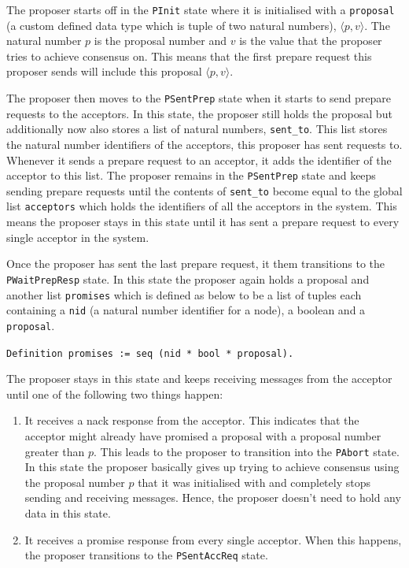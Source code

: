 The proposer starts off in the \texttt{PInit} state where it is initialised with
a \texttt{proposal} (a custom defined data type which is tuple of two natural numbers),
$\langle p, v \rangle$.
The natural number $p$ is the proposal number and $v$ is the value that the
proposer tries to achieve consensus on. This means that the first prepare
request this proposer sends will include this proposal $\langle p, v \rangle$.

The proposer then moves to the \texttt{PSentPrep} state when it starts to send prepare
requests to the acceptors. In this state, the proposer still holds the proposal
but additionally now also stores a list of natural numbers, \texttt{sent\_to}. This list stores the
natural number identifiers of the acceptors, this proposer has sent requests to.
Whenever it sends a prepare request to an acceptor, it adds the identifier of
the acceptor to this list.
The proposer remains in the \texttt{PSentPrep} state and keeps sending prepare requests
until the contents of \texttt{sent\_to} become equal to the global list \texttt{acceptors} which
holds the identifiers of all the acceptors in the system. This means the proposer
stays in this state until it has sent a prepare request to every single acceptor
in the system.

Once the proposer has sent the last prepare request, it them transitions to
the \texttt{PWaitPrepResp} state. In this state the proposer again holds a proposal and
another list \texttt{promises} which is defined as below to be a list of tuples
each containing a \texttt{nid} (a natural number identifier for a node), a boolean
and a \texttt{proposal}.

\texttt{Definition promises := seq (nid * bool * proposal).}

The proposer stays in this state and keeps receiving messages from the acceptor
until one of the following two things happen:
\begin{enumerate}
  \item It receives a nack response from the acceptor. This indicates that the
    acceptor might already have promised a proposal
    with a proposal number greater than $p$. This leads to the proposer to
    transition into the \texttt{PAbort} state. In this state the proposer basically
    gives up trying to achieve consensus using the proposal number $p$ that it was
    initialised with and completely stops sending and receiving messages. Hence,
    the proposer doesn't need to hold any data in this state.
  \item It receives a promise response from every single acceptor. When this
    happens, the proposer transitions to the \texttt{PSentAccReq} state.
\end{enumerate}

